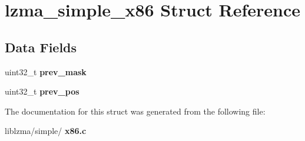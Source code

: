\section{lzma\+\_\+simple\+\_\+x86 Struct Reference}
\label{structlzma__simple__x86}
\subsection*{Data Fields}
\begin{DoxyCompactItemize}
\item 
\mbox{\label{structlzma__simple__x86_af0e2a50d1b76c23e4cf63776842071d6}} 
uint32\+\_\+t {\bfseries prev\+\_\+mask}
\item 
\mbox{\label{structlzma__simple__x86_acdb923ffb1c0ba7400163d381fdd8227}} 
uint32\+\_\+t {\bfseries prev\+\_\+pos}
\end{DoxyCompactItemize}


The documentation for this struct was generated from the following file\+:\begin{DoxyCompactItemize}
\item 
liblzma/simple/\textbf{ x86.\+c}\end{DoxyCompactItemize}
